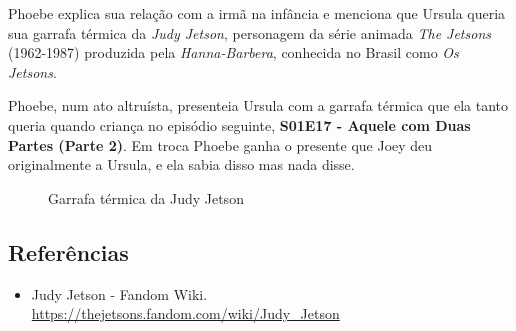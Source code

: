 Phoebe explica sua relação com a irmã na infância e menciona que Ursula
queria sua garrafa térmica da \emph{Judy Jetson}, personagem da série
animada \emph{The Jetsons} (1962-1987) produzida pela
\emph{Hanna-Barbera}, conhecida no Brasil como \emph{Os Jetsons}.

Phoebe, num ato altruísta, presenteia Ursula com a garrafa térmica que
ela tanto queria quando criança no episódio seguinte,
\textbf{\textcolor{primarycolor}{S01E17 - Aquele com Duas Partes (Parte 2)}}.
Em troca Phoebe ganha o presente que Joey deu originalmente a Ursula, e
ela sabia disso mas nada disse.

\begin{figure}
  \centering
    \caption{Garrafa térmica da Judy Jetson\label{fig:garrafa-t-rmica-da-judy-jetson}}
\end{figure}

\hypertarget{referuxeancias-6}{%
\subsection{Referências}\label{referuxeancias-6}}

\begin{itemize}
\tightlist
\item
  \sloppy Judy Jetson - Fandom Wiki. \url{https://thejetsons.fandom.com/wiki/Judy_Jetson}
\end{itemize}
